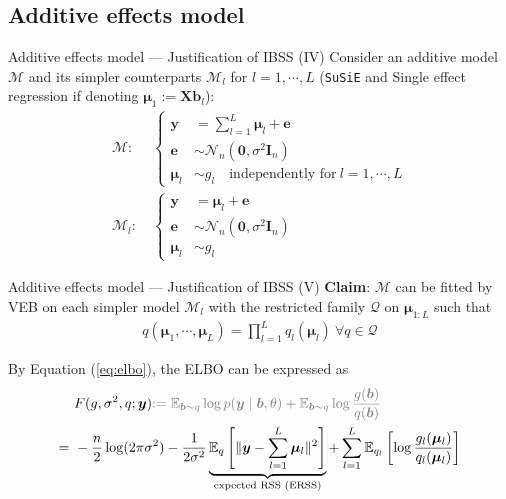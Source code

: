 \documentclass[10pt]{beamer}
\begin{document}
\subsection{Additive effects model}


\begin{frame}{Additive effects model --- \normalsize Justification of IBSS (IV)}
    Consider an additive model $\mathcal{M}$ and its simpler counterparts $\mathcal{M}_l$ for $l=1,\cdots,L$
    (\texttt{SuSiE} and Single effect regression if denoting $\bm{\mu}_1:=\bm{X}\bm{b}_l$):
    \begin{align}
        \mathcal{M}:&\
        \begin{cases}
            \bm{y} & = \sum_{l=1}^L\bm{\mu}_l + \bm{e} \\
            \bm{e} & \sim \mathcal{N}_n(\bm{0},\sigma^2\bm{I}_n) \\
            \bm{\mu}_l & \sim g_l\quad \text{independently for}\ l = 1,\cdots,L
        \end{cases} \label{eq:multeff}\\
        \mathcal{M}_l:&\
        \begin{cases}
            \bm{y} & = \bm{\mu}_l + \bm{e} \\
            \bm{e} & \sim \mathcal{N}_n(\bm{0},\sigma^2\bm{I}_n) \\
            \bm{\mu}_l & \sim g_l
        \end{cases}\label{eq:singleff}
    \end{align}
\end{frame}



\begin{frame}{Additive effects model --- \normalsize Justification of IBSS (V)}
    \textbf{Claim}: $\mathcal{M}$ can be fitted by VEB on each simpler model $\mathcal{M}_l$ 
    with the restricted family $\mathcal{Q}$ on $\bm{\mu}_{1:L}$ 
    such that 
    {\footnotesize
    \begin{gather}
        q(\bm{\mu}_1,\cdots,\bm{\mu}_L)=\prod_{l=1}^L q_l(\bm{\mu}_l)~\forall q\in\mathcal{Q}
    \end{gather}}
    
    \medskip
    
    By Equation (\ref{eq:elbo}), the ELBO can be expressed as
    {\footnotesize
    \begin{align}
        & ~ F(g, \sigma^2, q ; \bm{y}) 
         {\color{gray}:= \mathbb{E}_{\bm{b}\sim q} \log p(\bm{y}\mid\bm{b},\theta) + \mathbb{E}_{\bm{b}\sim q}\log\frac{g(\bm{b})}{q(\bm{b})}} \notag \\
        = & ~ -\frac{n}{2}\log(2\pi\sigma^2) 
        - \frac{1}{2\sigma^2}\underbrace{\mathbb{E}_{q}\left[\|\bm{y} - \sum_{l=1}^L\bm{\mu}_l\|^2\right]}_{\text{expected RSS (ERSS)}} 
        + \sum_{l=1}^L\mathbb{E}_{q_l}\left[\log\frac{g_l(\bm{\mu}_l)}{q_l(\bm{\mu}_l)}\right] \label{eq:elboadditive}
    \end{align}}
\end{frame}
\end{document}
